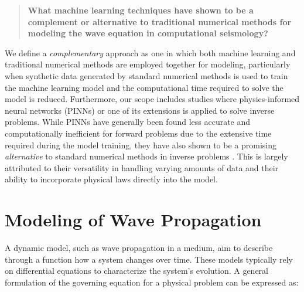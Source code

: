 \documentclass[11pt,twoside]{article}
\begin{document}
\begin{tcolorbox}[colback=gray!20, colframe=gray!20, sharp corners]
\begin{quote}
\noindent\textbf{What machine learning techniques have shown to be a complement or alternative to traditional 
numerical methods for modeling the wave equation in computational seismology?}
\end{quote}
\end{tcolorbox}

\vspace*{2mm}

We define a \textit{complementary} approach as one in which both machine learning and traditional numerical methods are 
employed together for modeling, particularly when synthetic data generated by standard numerical methods is used to train 
the machine learning model and the computational time required to solve the model is reduced. 
Furthermore, our scope includes studies where physics-informed neural networks (PINNs) or one of 
its extensions is applied to solve inverse problems. While PINNs have generally been found less accurate and computationally 
inefficient for forward problems due to the extensive time required during the model training, they have also shown to be a promising 
\textit{alternative} to standard numerical methods in inverse problems \citep{haghighat_physics-informed_2021, 
raissi_hidden_2020, hao_physics-informed_2023}. This is largely attributed to their versatility in handling varying 
amounts of data and their ability to incorporate physical laws directly into the model.

\section{Modeling of Wave Propagation}\label{sec:modeling_wave_propagation}

A dynamic model, such as wave propagation in a medium, aim to describe through a function how a system changes over time. 
These models typically rely on differential equations to characterize the system's evolution. A general formulation of 
the governing equation for a physical problem can be expressed as:
\end{document}
